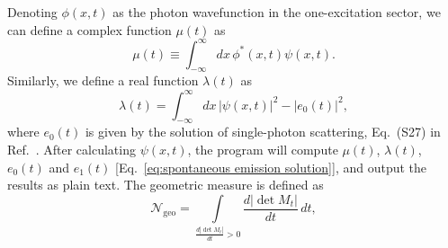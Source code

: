 \documentclass[12pt,letter,onecolumn,notitlepage]{article}
\begin{document}
\begin{appendices}
Denoting $\phi(x, t)$ as the photon wavefunction in the one-excitation sector, 
we can define a complex function $\mu(t)$ as
\begin{equation}
	\mu(t) \equiv \int_{-\infty}^{\infty}dx\, \phi^*(x, t) \psi(x, t). %
	\label{eq:mu}
\end{equation}
Similarly, we define a real function $\lambda(t)$ as
\begin{equation}
	\lambda(t) = \int_{-\infty}^{\infty}dx\, |\psi(x, t)|^2 - |e_0(t)|^2, %
	\label{eq:lambda}
\end{equation}
where $e_0(t)$ is given by the solution of single-photon scattering, Eq.~(S27) in Ref.~\cite{FangNM17}. %
After calculating $\psi(x,t)$, the program will compute $\mu(t)$, $\lambda(t)$, $e_0(t)$ and $e_1(t)$ [Eq.~\eqref{eq:spontaneous emission solution}], and output the results as plain text. 
The geometric measure is defined as \cite{LorenzoPRA13}
\begin{equation}
\mathcal{N}_\text{geo}=\int\limits_{\frac{d|\det M_t|}{dt}>0} \frac{d|\det M_t|}{dt}\,dt,

\end{equation}
\end{appendices}
\end{document}
